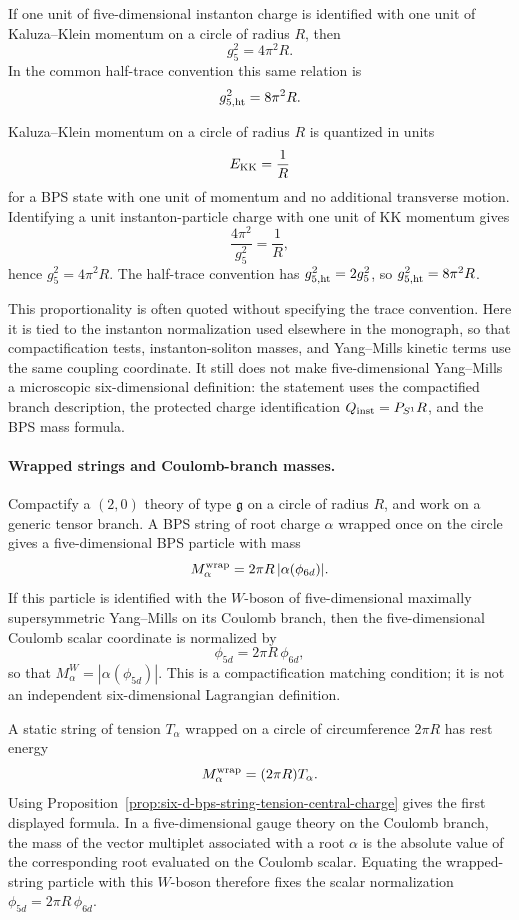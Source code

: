 If one unit of five-dimensional instanton charge is identified with one unit
of Kaluza--Klein momentum on a circle of radius \(R\), then
\[
  g_5^2=4\pi^2R .
\]
In the common half-trace convention this same relation is
\[
  g_{5,\rm ht}^2=8\pi^2R .
\]

Kaluza--Klein momentum on a circle of radius \(R\) is quantized in units
\[
  E_{\rm KK}=\frac1R
\]
for a BPS state with one unit of momentum and no additional transverse
motion.  Identifying a unit instanton-particle charge with one unit of KK
momentum gives
\[
  \frac{4\pi^2}{g_5^2}=\frac1R,
\]
hence \(g_5^2=4\pi^2R\).  The half-trace convention has
\(g_{5,\rm ht}^2=2g_5^2\), so \(g_{5,\rm ht}^2=8\pi^2R\).

This proportionality is often quoted without specifying the trace convention.
Here it is tied to the instanton normalization used elsewhere in the monograph,
so that
compactification tests, instanton-soliton masses, and Yang--Mills kinetic
terms use the same coupling coordinate.
It still does not make five-dimensional Yang--Mills a microscopic
six-dimensional definition: the statement uses the compactified branch
description, the protected charge identification
\(Q_{\rm inst}=P_{S^1}R\), and the BPS mass formula.

\paragraph{Wrapped strings and Coulomb-branch masses.}
Compactify a \((2,0)\) theory of type \(\mathfrak g\) on a circle of radius
\(R\), and work on a generic tensor branch.  A BPS string of root charge
\(\alpha\) wrapped once on the circle gives a five-dimensional BPS particle
with mass
\[
  M_\alpha^{\rm wrap}=2\pi R\,|\alpha(\phi_{6d})| .
\]
If this particle is identified with the \(W\)-boson of five-dimensional
maximally supersymmetric Yang--Mills on its Coulomb branch, then the
five-dimensional Coulomb scalar coordinate is normalized by
\[
  \phi_{5d}=2\pi R\,\phi_{6d},
\]
so that \(M_\alpha^{W}=|\alpha(\phi_{5d})|\).  This is a compactification
matching condition; it is not an independent six-dimensional Lagrangian
definition.

A static string of tension \(T_\alpha\) wrapped on a circle of circumference
\(2\pi R\) has rest energy
\[
  M_\alpha^{\rm wrap}=(2\pi R)T_\alpha .
\]
Using Proposition~\ref{prop:six-d-bps-string-tension-central-charge} gives
the first displayed formula.  In a five-dimensional gauge theory on the
Coulomb branch, the mass of the vector multiplet associated with a root
\(\alpha\) is the absolute value of the corresponding root evaluated on the
Coulomb scalar.  Equating the wrapped-string particle with this \(W\)-boson
therefore fixes the scalar normalization
\(\phi_{5d}=2\pi R\,\phi_{6d}\).

